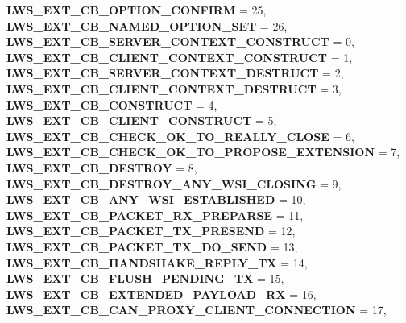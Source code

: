 \begin{DoxyCompactItemize}
{\bfseries L\+W\+S\+\_\+\+E\+X\+T\+\_\+\+C\+B\+\_\+\+O\+P\+T\+I\+O\+N\+\_\+\+C\+O\+N\+F\+I\+RM} = 25, 
{\bfseries L\+W\+S\+\_\+\+E\+X\+T\+\_\+\+C\+B\+\_\+\+N\+A\+M\+E\+D\+\_\+\+O\+P\+T\+I\+O\+N\+\_\+\+S\+ET} = 26, 
{\bfseries L\+W\+S\+\_\+\+E\+X\+T\+\_\+\+C\+B\+\_\+\+S\+E\+R\+V\+E\+R\+\_\+\+C\+O\+N\+T\+E\+X\+T\+\_\+\+C\+O\+N\+S\+T\+R\+U\+CT} = 0, 
{\bfseries L\+W\+S\+\_\+\+E\+X\+T\+\_\+\+C\+B\+\_\+\+C\+L\+I\+E\+N\+T\+\_\+\+C\+O\+N\+T\+E\+X\+T\+\_\+\+C\+O\+N\+S\+T\+R\+U\+CT} = 1, 
\newline
{\bfseries L\+W\+S\+\_\+\+E\+X\+T\+\_\+\+C\+B\+\_\+\+S\+E\+R\+V\+E\+R\+\_\+\+C\+O\+N\+T\+E\+X\+T\+\_\+\+D\+E\+S\+T\+R\+U\+CT} = 2, 
{\bfseries L\+W\+S\+\_\+\+E\+X\+T\+\_\+\+C\+B\+\_\+\+C\+L\+I\+E\+N\+T\+\_\+\+C\+O\+N\+T\+E\+X\+T\+\_\+\+D\+E\+S\+T\+R\+U\+CT} = 3, 
{\bfseries L\+W\+S\+\_\+\+E\+X\+T\+\_\+\+C\+B\+\_\+\+C\+O\+N\+S\+T\+R\+U\+CT} = 4, 
{\bfseries L\+W\+S\+\_\+\+E\+X\+T\+\_\+\+C\+B\+\_\+\+C\+L\+I\+E\+N\+T\+\_\+\+C\+O\+N\+S\+T\+R\+U\+CT} = 5, 
\newline
{\bfseries L\+W\+S\+\_\+\+E\+X\+T\+\_\+\+C\+B\+\_\+\+C\+H\+E\+C\+K\+\_\+\+O\+K\+\_\+\+T\+O\+\_\+\+R\+E\+A\+L\+L\+Y\+\_\+\+C\+L\+O\+SE} = 6, 
{\bfseries L\+W\+S\+\_\+\+E\+X\+T\+\_\+\+C\+B\+\_\+\+C\+H\+E\+C\+K\+\_\+\+O\+K\+\_\+\+T\+O\+\_\+\+P\+R\+O\+P\+O\+S\+E\+\_\+\+E\+X\+T\+E\+N\+S\+I\+ON} = 7, 
{\bfseries L\+W\+S\+\_\+\+E\+X\+T\+\_\+\+C\+B\+\_\+\+D\+E\+S\+T\+R\+OY} = 8, 
{\bfseries L\+W\+S\+\_\+\+E\+X\+T\+\_\+\+C\+B\+\_\+\+D\+E\+S\+T\+R\+O\+Y\+\_\+\+A\+N\+Y\+\_\+\+W\+S\+I\+\_\+\+C\+L\+O\+S\+I\+NG} = 9, 
\newline
{\bfseries L\+W\+S\+\_\+\+E\+X\+T\+\_\+\+C\+B\+\_\+\+A\+N\+Y\+\_\+\+W\+S\+I\+\_\+\+E\+S\+T\+A\+B\+L\+I\+S\+H\+ED} = 10, 
{\bfseries L\+W\+S\+\_\+\+E\+X\+T\+\_\+\+C\+B\+\_\+\+P\+A\+C\+K\+E\+T\+\_\+\+R\+X\+\_\+\+P\+R\+E\+P\+A\+R\+SE} = 11, 
{\bfseries L\+W\+S\+\_\+\+E\+X\+T\+\_\+\+C\+B\+\_\+\+P\+A\+C\+K\+E\+T\+\_\+\+T\+X\+\_\+\+P\+R\+E\+S\+E\+ND} = 12, 
{\bfseries L\+W\+S\+\_\+\+E\+X\+T\+\_\+\+C\+B\+\_\+\+P\+A\+C\+K\+E\+T\+\_\+\+T\+X\+\_\+\+D\+O\+\_\+\+S\+E\+ND} = 13, 
\newline
{\bfseries L\+W\+S\+\_\+\+E\+X\+T\+\_\+\+C\+B\+\_\+\+H\+A\+N\+D\+S\+H\+A\+K\+E\+\_\+\+R\+E\+P\+L\+Y\+\_\+\+TX} = 14, 
{\bfseries L\+W\+S\+\_\+\+E\+X\+T\+\_\+\+C\+B\+\_\+\+F\+L\+U\+S\+H\+\_\+\+P\+E\+N\+D\+I\+N\+G\+\_\+\+TX} = 15, 
{\bfseries L\+W\+S\+\_\+\+E\+X\+T\+\_\+\+C\+B\+\_\+\+E\+X\+T\+E\+N\+D\+E\+D\+\_\+\+P\+A\+Y\+L\+O\+A\+D\+\_\+\+RX} = 16, 
{\bfseries L\+W\+S\+\_\+\+E\+X\+T\+\_\+\+C\+B\+\_\+\+C\+A\+N\+\_\+\+P\+R\+O\+X\+Y\+\_\+\+C\+L\+I\+E\+N\+T\+\_\+\+C\+O\+N\+N\+E\+C\+T\+I\+ON} = 17, 

\end{DoxyCompactItemize}
